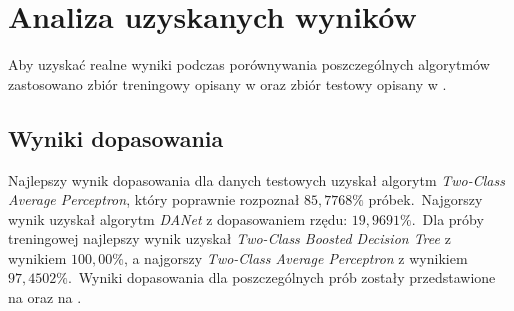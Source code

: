 \section{Analiza uzyskanych wyników}
Aby uzyskać realne wyniki podczas porównywania poszczególnych algorytmów zastosowano zbiór treningowy opisany w  oraz zbiór testowy opisany w .

\subsection{Wyniki dopasowania}
Najlepszy wynik dopasowania dla danych testowych uzyskał algorytm \textit{Two-Class Average Perceptron}, który poprawnie rozpoznał $85,7768\%$ próbek.\ Najgorszy wynik uzyskał algorytm \textit{DANet} z dopasowaniem rzędu: $19,9691\%$.\ Dla próby treningowej najlepszy wynik uzyskał \textit{Two-Class Boosted Decision Tree} z wynikiem $100,00\%$, a najgorszy \textit{Two-Class Average Perceptron} z wynikiem $97,4502\%$.\ Wyniki dopasowania dla poszczególnych prób zostały przedstawione na  oraz na .

